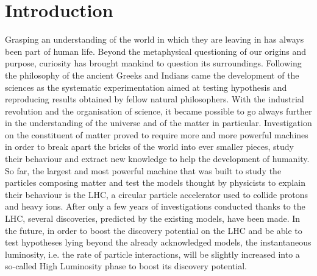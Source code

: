 \renewcommand\evenpagerightmark{{\scshape\small Chapter 1}}
\renewcommand\oddpageleftmark{{\scshape\small Introduction}}

\renewcommand{\bibname}{References}

\hyphenation{}

\chapter[Introduction]{Introduction}
\label{chap:intro}

Grasping an understanding of the world in which they are leaving in has always been part of human life. Beyond the metaphysical questioning of our origins and purpose, curiosity has brought mankind to question its surroundings. Following the philosophy of the ancient Greeks and Indians came the development of the sciences as the systematic experimentation aimed at testing hypothesis and reproducing results obtained by fellow natural philosophers. With the industrial revolution and the organisation of science, it became possible to go always further in the understanding of the universe and of the matter in particular. Investigation on the constituent of matter proved to require more and more powerful machines in order to break apart the bricks of the world into ever smaller pieces, study their behaviour and extract new knowledge to help the development of humanity. So far, the largest and most powerful machine that was built to study the particles composing matter and test the models thought by physicists to explain their behaviour is the \acf{LHC}, a circular particle accelerator used to collide protons and heavy ions. After only a few years of investigations conducted thanks to the LHC, several discoveries, predicted by the existing models, have been made. In the future, in order to boost the discovery potential on the LHC and be able to test hypotheses lying beyond the already acknowledged models, the instantaneous luminosity, i.e. the rate of particle interactions, will be slightly increased into a so-called High Luminosity phase to boost its discovery potential.

